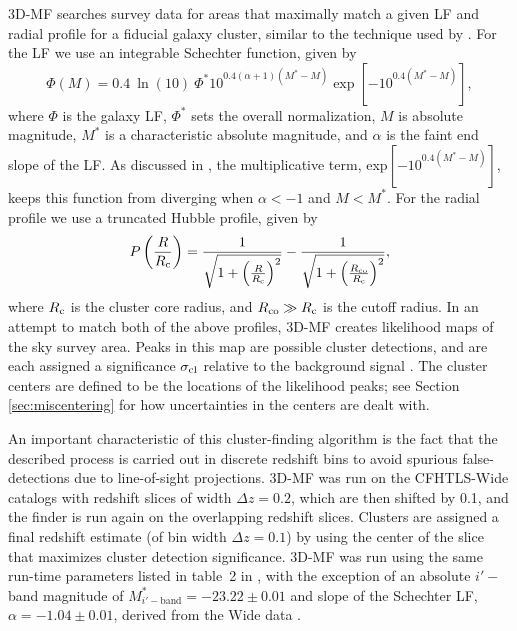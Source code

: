 \ac{3D-MF} searches survey data for areas that maximally match a given \ac{LF} and radial profile for a fiducial galaxy cluster, similar to the technique used by \citet{Postman96}.  For the \ac{LF} we use an integrable Schechter function, given by
\begin{equation}
\Phi(M)=0.4 \ \ln(10) \ \Phi^* 10^{0.4(\alpha + 1)(M^*-M)} \exp \left[ -10^{0.4(M^*-M)} \right],
\end{equation}
where $\Phi$ is the galaxy \ac{LF}, $\Phi^*$ sets the overall normalization, $M$ is absolute magnitude, $M^*$ is a characteristic absolute magnitude, and $\alpha$ is the faint end slope of the \ac{LF}. As discussed in \citet{Milkeraitis10}, the multiplicative term, exp$[-10^{0.4(M^{*}-M)}]$, keeps this function from diverging when $\alpha < -1$ and $M < M^*$. For the radial profile we use a truncated Hubble profile, given by
\begin{equation}
P \left ( \frac{R}{R_{\rm c}} \right )=\frac{1}{\sqrt{1+ \left ( \frac{R}{R_{\rm c}} \right ) ^2}} - \frac{1}{\sqrt{1+ \left ( \frac{R_{\rm co}}{R_{\rm c}} \right ) ^2}},
\end{equation}
where $R_{\rm c}$ is the cluster core radius, and $R_{\rm co} \gg R_{\rm c}$ is the cutoff radius. In an attempt to match both of the above profiles, \ac{3D-MF} creates likelihood maps of the sky survey area. Peaks in this map are possible cluster detections, and are each assigned a significance $\sigma_{\rm cl}$ relative to the background signal \citep[$\sigma_{\rm cl}$ is calculated using Equation 5 of][which the reader is referred to for more details]{Milkeraitis10}. The cluster centers are defined to be the locations of the likelihood peaks; see Section \ref{sec:miscentering} for how uncertainties in the centers are dealt with.

An important characteristic of this cluster-finding algorithm is the fact that the described process is carried out in discrete redshift bins to avoid spurious false-detections due to line-of-sight projections. \ac{3D-MF} was run on the \ac{CFHTLS}-Wide catalogs with redshift slices of width $\Delta z = 0.2$, which are then shifted by 0.1, and the finder is run again on the overlapping redshift slices. Clusters are assigned a final redshift estimate (of bin width $\Delta z = 0.1$) by using the center of the slice that maximizes cluster detection significance. \ac{3D-MF} was run using the same run-time parameters listed in table~2 in \citet{Milkeraitis10}, with the exception of an absolute $i'-$band magnitude of $M^*_{i'-\mathrm{band}}=-23.22 \pm 0.01$ and slope of the Schechter \ac{LF}, $\alpha=-1.04 \pm 0.01$, derived from the Wide data \citep{MMthesis11}.

